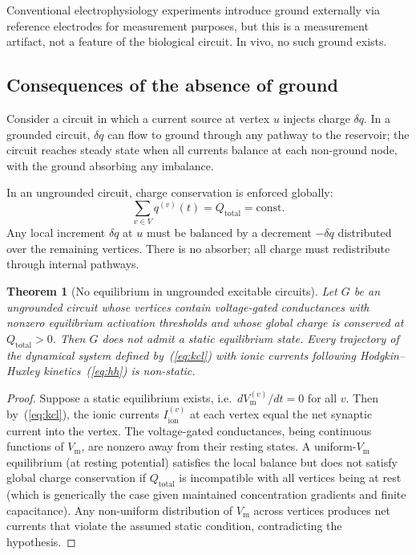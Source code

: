 \documentclass[11pt,twocolumn,a4paper]{article}
\newtheorem{theorem}{Theorem}[section]
\theoremstyle{definition}
\theoremstyle{remark}
\newcommand{\Vm}{V_{\mathrm{m}}}
\newcommand{\Iion}{I_{\mathrm{ion}}}
\begin{document}
Conventional electrophysiology experiments introduce ground externally
via reference electrodes for measurement purposes, but this is a
measurement artifact, not a feature of the biological circuit. In vivo,
no such ground exists.

\subsection{Consequences of the absence of ground}

Consider a circuit in which a current source at vertex $u$ injects
charge $\delta q$. In a grounded circuit, $\delta q$ can flow to
ground through any pathway to the reservoir; the circuit reaches
steady state when all currents balance at each non-ground node, with
the ground absorbing any imbalance.

In an ungrounded circuit, charge conservation is enforced globally:
\begin{equation}
\sum_{v \in V} q^{(v)}(t) = Q_{\mathrm{total}}
= \mathrm{const.}
\label{eq:global-conservation}
\end{equation}
Any local increment $\delta q$ at $u$ must be balanced by a
decrement $-\delta q$ distributed over the remaining vertices. There
is no absorber; all charge must redistribute through internal
pathways.

\begin{theorem}[No equilibrium in ungrounded excitable circuits]
\label{thm:no-equilibrium}
Let $G$ be an ungrounded circuit whose vertices contain voltage-gated
conductances with nonzero equilibrium activation thresholds and whose
global charge is conserved at $Q_{\mathrm{total}} > 0$. Then $G$ does
not admit a static equilibrium state. Every trajectory of the
dynamical system defined by~(\ref{eq:kcl}) with ionic currents
following Hodgkin--Huxley kinetics~(\ref{eq:hh}) is non-static.
\end{theorem}

\begin{proof}
Suppose a static equilibrium exists, i.e.\ $d\Vm^{(v)}/dt = 0$ for
all $v$. Then by~(\ref{eq:kcl}), the ionic currents $\Iion^{(v)}$ at
each vertex equal the net synaptic current into the vertex. The
voltage-gated conductances, being continuous functions of $\Vm$, are
nonzero away from their resting states. A uniform-$\Vm$ equilibrium
(at resting potential) satisfies the local balance but does not
satisfy global charge conservation if $Q_{\mathrm{total}}$ is
incompatible with all vertices being at rest (which is generically
the case given maintained concentration gradients and finite
capacitance). Any non-uniform distribution of $\Vm$ across vertices
produces net currents that violate the assumed static condition,
contradicting the hypothesis.
\end{proof}
\end{document}
